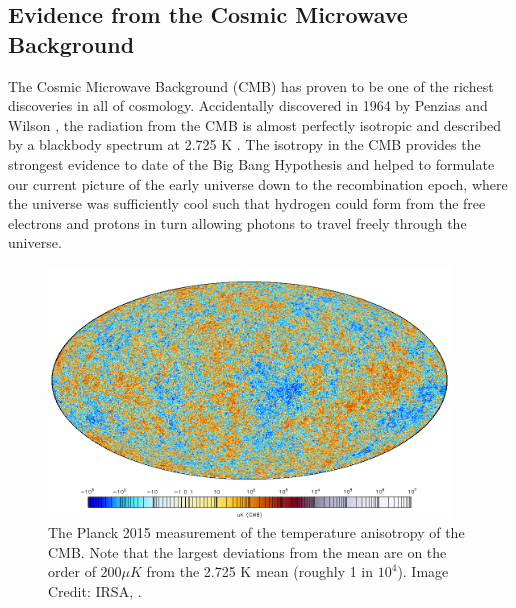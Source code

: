 \subsection{Evidence from the Cosmic Microwave Background}

The Cosmic Microwave Background (CMB) has proven to be one of the richest discoveries in all of cosmology.  Accidentally discovered in 1964 by Penzias and Wilson \cite{penzias1965measurement}, the radiation from the CMB is almost perfectly isotropic and described by a blackbody spectrum at 2.725 K \cite{fixsen1996cosmic}.  The isotropy in the CMB provides the strongest evidence to date of the Big Bang Hypothesis and helped to formulate our current picture of the early universe down to the recombination epoch, where the universe was sufficiently cool such that hydrogen could form from the free electrons and protons in turn allowing photons to travel freely through the universe.  

\begin{figure}[ht]
	\centering
	\includegraphics[width=0.95\textwidth]{planck_map}
	\caption{The Planck 2015 measurement of the temperature anisotropy of the CMB.  Note that the largest deviations from the mean are on the order of $200 \mu K$ from the 2.725 K mean (roughly 1 in $10^4$).  Image Credit: IRSA, .}
	\label{fig:planck_map}
\end{figure}

